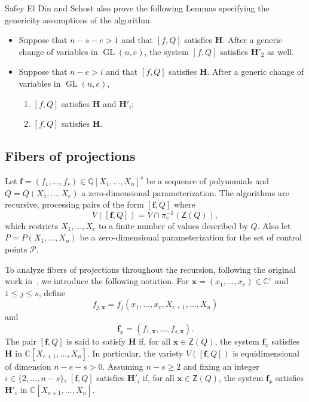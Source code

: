 \documentclass[12pt]{article}
\def\Zeroes{\mathsf{Z}}
\begin{document}
    
Safey El Din and Schost also prove the following Lemmas specifying the genericity assumptions of the algorithm.
%
\begin{itemize}
    \item \cite[Lemma 31:]{SchostMohabBabySteps2011} Suppose that $n - s - e > 1$ and that $[f, Q]$ satisfies $\bm H$. After a generic change of variables in $\operatorname{GL}(n, e)$, the system $[f, Q]$ satisfies $\bm H'_2$ as well.
    \item \cite[Lemma 34.]{SchostMohabBabySteps2011} Suppose that $n - e > i$ and that $[f, Q]$ satisfies $\bm H$. After a generic change of variables in $\operatorname{GL}(n, e)$,
    \begin{enumerate}\renewcommand{\labelenumi}{(\alph{enumi})}
        \item $[f, Q]$ satisfies $\bm H$ and $\bm H'_i$;
        \item $[f, Q]$ satisfies $\bm H$.
    \end{enumerate}
\end{itemize}











\subsection{Fibers of projections}



Let $\bm f = (f_1,\hdots,f_s) \in  \mathbb{Q}[X_1,\hdots,X_n]^s$ be a sequence of polynomials and $Q=Q(X_1,\hdots,X_e)$ a zero-dimensional parameterization. The algorithms are recursive, processing pairs of the form $[\bm f, Q]$ where 
\[
V ([\bm f, Q]) = V \cap \pi_e^{-1}(\Zeroes(Q)),
\]
which restricts $X_1,\hdots,X_e$ to a finite number of values described by $Q$. Also let $P=P(X_1,\hdots,X_n)$ be a zero-dimensional parameterization for the set of control points $\mathscr{P}.$ 



To analyze fibers of projections throughout the recursion, following the original work in~\cite{SchostMohabBabySteps2011}, we introduce the following notation. For $\bm x = (x_1, \dots, x_e) \in \mathbb{C}^e$ and $1 \leq j \leq s$, define 
\[
f_{j,\bm x} = f_j(x_1, \dots, x_e, X_{e+1}, \dots, X_n)
\]
and 
\[
\bm f_x = (f_{1,\bm x}, \dots, f_{s,\bm x}). 
\]
The pair $[\bm f, Q]$ is said to satisfy $\bm H$ if, for all $\bm x \in \Zeroes(Q)$, the system $\bm f_x$ satisfies $\bm H$ in $\mathbb{C}[X_{e+1}, \dots, X_n]$. In particular, the variety $V([\bm f, Q])$ is equidimensional of dimension $n - e - s > 0$. Assuming $n-s \geq 2$ and fixing an integer $i \in \{2, \dots, n-s\}$, $[\bm f, Q]$ satisfies $\bm H'_i$ if, for all $\bm x \in \Zeroes(Q)$, the system $\bm f_x$ satisfies $\bm H'_i$ in $\mathbb{C}[X_{e+1}, \dots, X_n]$.
\end{document}
